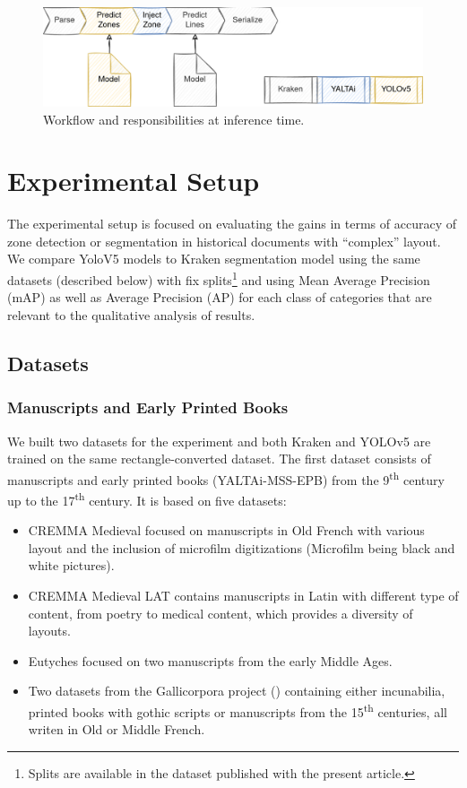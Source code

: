 \documentclass{jdmdh}
\begin{document}
\begin{figure}
    \centering
    \includegraphics[width=.8\linewidth]{images/yaltaiinjection.png}
    \caption{Workflow and responsibilities at inference time.}
    \label{fig:yaltai:injection}
\end{figure}

\section{Experimental Setup}

The experimental setup is focused on evaluating the gains in terms of accuracy of zone detection or segmentation in historical documents with ``complex'' layout. We compare YoloV5 models to Kraken segmentation model using the same datasets (described below) with fix splits\footnote{Splits are available in the dataset published with the present article.} and using Mean Average Precision (mAP) as well as Average Precision (AP) for each class of categories that are relevant to the qualitative analysis of results.

\subsection{Datasets}

\subsubsection{Manuscripts and Early Printed Books}

We built two datasets for the experiment and both Kraken and YOLOv5 are trained on the same rectangle-converted dataset. The first dataset consists of manuscripts and early printed books (YALTAi-MSS-EPB) from the 9\textsuperscript{th} century up to the 17\textsuperscript{th} century. It is based on five datasets:

\begin{itemize}
    \item CREMMA Medieval \citep{pinche2022cremma} focused on manuscripts in Old French with various layout and the inclusion of microfilm digitizations (Microfilm being black and white pictures).
    \item CREMMA Medieval LAT \citep{clerice2022cremma} contains manuscripts in Latin with different type of content, from poetry to medical content, which provides a diversity of layouts.
    \item Eutyches \citep{vlachou-efstathiou2022voss} focused on two manuscripts from the early Middle Ages.
    \item Two datasets from the Gallicorpora project (\citep{pinche2022mss, pinche2022goth}) containing either incunabilia, printed books with gothic scripts or manuscripts from the 15\textsuperscript{th} centuries, all writen in Old or Middle French.
\end{itemize}
\end{document}
